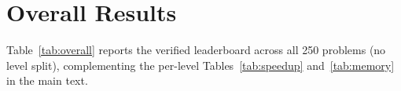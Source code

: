\documentclass[11pt]{article}
\begin{document}








\section{Overall Results}
\label{app:overall}

Table~\ref{tab:overall} reports the verified leaderboard across all 250 problems (no level split), complementing the per-level Tables~\ref{tab:speedup} and~\ref{tab:memory} in the main text.
\end{document}

